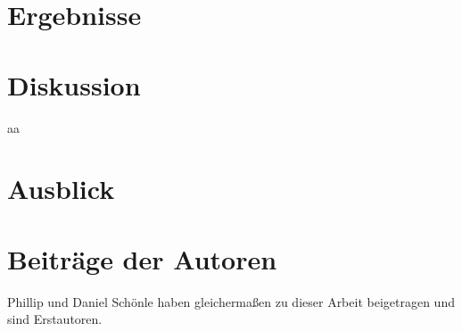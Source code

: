 \section{Ergebnisse}

\section{Diskussion}
aa
\section{Ausblick}

\section{Beiträge der Autoren}
 Phillip und Daniel Schönle haben gleichermaßen zu dieser Arbeit beigetragen und sind Erstautoren.